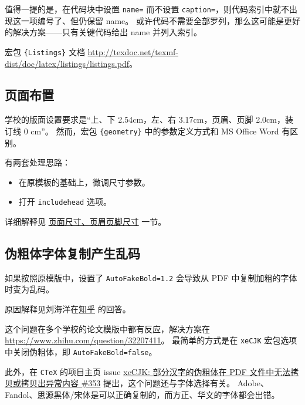 \documentclass[../Main/thesis.tex]{subfiles}
\begin{document}
值得一提的是，在代码块中设置 \texttt{name=} 而不设置
\texttt{caption=}，则代码索引中就不出现这一项编号了、但仍保留 name。
或许代码不需要全部罗列，那么这可能是更好的解决方案------只有关键代码给出
name 并列入索引。

宏包 \texttt{\{Listings\}} 文档
\url{http://texdoc.net/texmf-dist/doc/latex/listings/listings.pdf}。

\subsection{页面布置}

学校的版面设置要求是``上、下 2.54cm，左、右 3.17cm，页眉、页脚
2.0cm，装订线 0 cm''。 然而，宏包 \texttt{\{geometry\}}
中的参数定义方式和 MS Office Word 有区别。

有两套处理思路：

\begin{itemize}
\item
  在原模板的基础上，微调尺寸参数。

\item
  打开 \texttt{includehead} 选项。

\end{itemize}

详细解释见
\protect\hyperlink{geometry-ux5cux25e9ux5cux25a1ux5cux25b5ux5cux25e9ux5cux259dux5cux25a2ux5cux25e5ux5cux25b0ux5cux25baux5cux25e5ux5cux25afux5cux25b8ux5cux25e9ux5cux25a1ux5cux25b5ux5cux25e7ux5cux259cux5cux2589ux5cux25e9ux5cux25a1ux5cux25b5ux5cux25e8ux5cux2584ux5cux259aux5cux25e5ux5cux25b0ux5cux25baux5cux25e5ux5cux25afux5cux25b8}{页面尺寸、页眉页脚尺寸}
一节。

\subsection{伪粗体字体复制产生乱码}

如果按照原模版中，设置了 \texttt{AutoFakeBold=1.2} 会导致从 PDF
中复制加粗的字体时变为乱码。

原因解释见刘海洋在\href{https://www.zhihu.com/question/59597144}{知乎}
的回答。

这个问题在多个学校的论文模版中都有反应，解决方案在
\url{https://www.zhihu.com/question/32207411}。 最简单的方式是在
\texttt{xeCJK} 宏包选项中关闭伪粗体，即 \texttt{AutoFakeBold=false}。

此外，在 \texttt{CTeX} 的项目主页 issue
\href{https://github.com/CTeX-org/ctex-kit/issues/353}{xeCJK:
部分汉字的伪粗体在 PDF 文件中无法拷贝或拷贝出异常内容 \#353}
提出，这个问题还与字体选择有关。
Adobe、Fandol、思源黑体/宋体是可以正确复制的，而方正、华文的字体都会出错。
\end{document}
